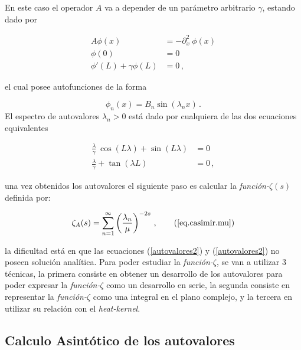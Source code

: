 En este caso el operador $A$ va a depender de un parámetro arbitrario $\gamma$, estando dado por

\begin{equation}
\begin{aligned}
    A \phi (x) &= - \partial ^2 _x \ \phi (x)  \\[5pt]
    \phi (0) &= 0 \\[5pt]
    \phi ' (L) + \gamma \phi (L) &= 0 \, ,
\end{aligned}
\end{equation}

el cual posee autofunciones de la forma

\begin{equation}
\phi _n (x) = 
B _n \sin ( \lambda _n x ) \, .
\end{equation}
El espectro de autovalores $\lambda _n > 0 $ está dado por  cualquiera de las dos ecuaciones equivalentes

\begin{align}
    \frac{\lambda}{\gamma}  \ \cos( L \lambda ) +   \sin( L \lambda ) &= 0 \label{autovalores2} \\[5pt]
    \frac{\lambda}{\gamma}  + \tan (\lambda L )  &= 0 \, , \label{autovalores}
\end{align}



una vez obtenidos los autovalores el siguiente paso es calcular la {\it función-$\zeta  (s) $} definida por:

\begin{equation}
    \zeta _ {A } (s) =  \sum_{n = 1} ^{ \infty } \left( \frac{\lambda _n}{\mu } \right) ^ {-2 s} \, ,
    \tag{\ref{eq.casimir.mu}}
\end{equation}

la dificultad está en que las ecuaciones (\ref{autovalores2}) y (\ref{autovalores2}) no poseen solución analítica. Para poder estudiar la  {\it función-$\zeta$}, se van a utilizar 3 técnicas, la primera consiste en obtener un desarrollo de los autovalores para poder expresar la {\it función-$\zeta$} como un desarrollo en serie, la segunda consiste en representar la {\it función-$\zeta$} como una integral en el plano complejo, y la tercera en utilizar su relación con el {\it heat-kernel}. 

\subsection{Calculo Asintótico de los autovalores}{\label{seq.asin}}

